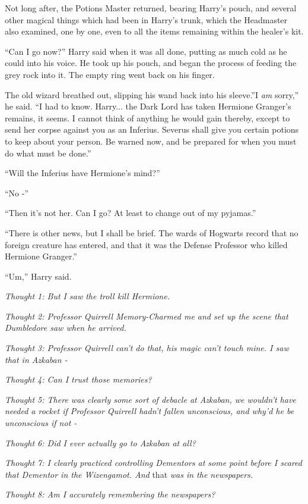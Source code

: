 Not long after, the Potions Master returned, bearing Harry's pouch, and
several other magical things which had been in Harry's trunk, which the
Headmaster also examined, one by one, even to all the items remaining
within the healer's kit.

``Can I go now?'' Harry said when it was all done, putting as much cold
as he could into his voice. He took up his pouch, and began the process
of feeding the grey rock into it. The empty ring went back on his
finger.

The old wizard breathed out, slipping his wand back into his sleeve.''I
\emph{am} sorry,'' he said. ``I had to know. Harry... the Dark Lord
has taken Hermione Granger's remains, it seems. I cannot think of
anything he would gain thereby, except to send her corpse against you as
an Inferius. Severus shall give you certain potions to keep about your
person. Be warned now, and be prepared for when you must do what must be
done.''

``Will the Inferius have Hermione's mind?''

``No -''

``Then it's not her. Can I go? At least to change out of my pyjamas.''

``There is other news, but I shall be brief. The wards of Hogwarts
record that no foreign creature has entered, and that it was the Defense
Professor who killed Hermione Granger.''

``Um,'' Harry said.

\emph{Thought 1: But I saw the troll kill Hermione.}

\emph{Thought 2: Professor Quirrell Memory-Charmed me and set up the
scene that Dumbledore saw when he arrived.}

\emph{Thought 3: Professor Quirrell can't do that, his magic can't touch
mine. I saw that in Azkaban -}

\emph{Thought 4: Can I trust those memories?}

\emph{Thought 5: There was clearly some sort of debacle at Azkaban, we
wouldn't have needed a rocket if Professor Quirrell hadn't fallen
unconscious, and why'd he be unconscious if not -}

\emph{Thought 6: Did I ever actually go to Azkaban at all?}

\emph{Thought 7: I clearly practiced controlling Dementors at some point
before I scared that Dementor in the Wizengamot. And} that \emph{was in
the newspapers.}

\emph{Thought 8: Am I accurately remembering the newspapers?}

